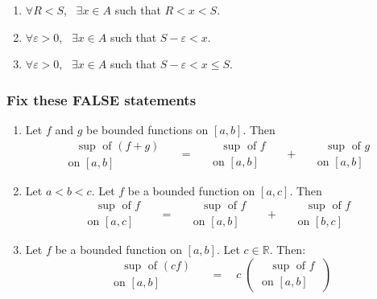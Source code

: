 \documentclass[14pt]{beamer}
\newcommand{\e}{\varepsilon}
\newcommand{\setsize}[1]{\fontsize{#1}{#1}\selectfont} %
\newcommand{\smallerfont}{\setsize{13}} %
\begin{document}
\begin{frame}[t]
\begin{enumerate}
			\item ${\displaystyle \forall R < S}$, \,
				${\displaystyle \exists x \in A}$ \; such that \;
				${\displaystyle R < x < S}$.
				\vspace{.2cm}

			\item ${\displaystyle \forall \e>0}$, \; \,
				${\displaystyle \exists x \in A}$ \; such that \;
				${\displaystyle S - \e < x }$.

			\item ${\displaystyle \forall \e>0}$, \; \,
				${\displaystyle \exists x \in A}$ \; such that \;
				${\displaystyle S - \e < x \leq S }$.
		\end{enumerate}
	\end{frame}
	\begin{frame}[t]
		\smallerfont
		\frametitle{Fix these FALSE statements}

		\begin{enumerate}
			\item Let $f$ and $g$ be bounded functions on $[a,b]$. Then
				\[
					\; \substack{\mbox{ $\sup$ of $(f+g)$} \\ \mbox{on $[a,b]$} }\; \quad =
					\quad \; \substack{\mbox{ $\sup$ of $f$} \\ \mbox{on $[a,b]$} }\; \quad
					+ \quad \; \substack{\mbox{ $\sup$ of $g$} \\ \mbox{on $[a,b]$} }\;
				\]

				\vfill

			\item Let $a < b < c$. Let $f$ be a bounded function on $[a,c]$. Then
				\[
					\; \substack{\mbox{ $\sup$ of $f$} \\ \mbox{on $[a,c]$} }\; \quad = \quad
					\; \substack{\mbox{ $\sup$ of $f$} \\ \mbox{on $[a,b]$} }\; \quad + \quad
					\; \substack{\mbox{ $\sup$ of $f$} \\ \mbox{on $[b,c]$} }\;
				\]

				\vfill

			\item Let $f$ be a bounded function on $[a,b]$. Let $c \in \mathbb{R}$. Then:
				\[
					\; \substack{\mbox{ $\sup$ of $(cf)$} \\ \mbox{on $[a,b]$} }\; \quad =
					\quad c \; \left( \; \substack{\mbox{ $\sup$ of $f$} \\ \mbox{on $[a,b]$} }
					\; \right)
				\]
		\end{enumerate}
	\end{frame}
\end{document}
